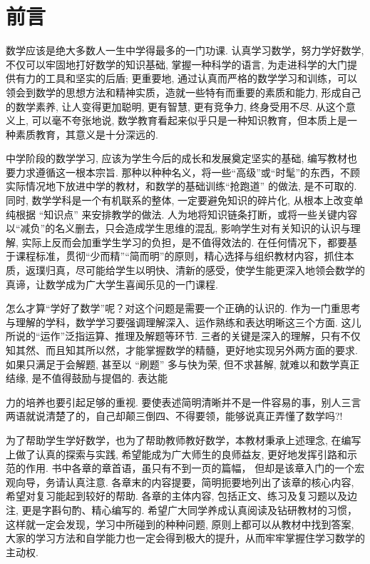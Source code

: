 \documentclass[10pt]{article}
\begin{document}
\section*{前言}

数学应该是绝大多数人一生中学得最多的一门功课. 认真学习数学，努力学好数学, 不仅可以牢固地打好数学的知识基础, 掌握一种科学的语言, 为走进科学的大门提供有力的工具和坚实的后盾; 更重要地, 通过认真而严格的数学学习和训练，可以领会到数学的思想方法和精神实质，造就一些特有而重要的素质和能力, 形成自己的数学素养, 让人变得更加聪明, 更有智慧, 更有竞争力, 终身受用不尽. 从这个意义上, 可以毫不夸张地说, 数学教育看起来似乎只是一种知识教育，但本质上是一种素质教育，其意义是十分深远的.

中学阶段的数学学习, 应该为学生今后的成长和发展奠定坚实的基础, 编写教材也要力求遵循这一根本宗旨. 那种以种种名义，将一些“高级”或“时髦”的东西，不顾实际情况地下放进中学的教材，和数学的基础训练“抢跑道” 的做法, 是不可取的. 同时, 数学学科是一个有机联系的整体, 一定要避免知识的碎片化, 从根本上改变单纯根据 “知识点” 来安排教学的做法. 人为地将知识链条打断，或将一些关键内容以“减负”的名义删去，只会造成学生思维的混乱, 影响学生对有关知识的认识与理解, 实际上反而会加重学生学习的负担，是不值得效法的. 在任何情况下，都要基于课程标准，贯彻“少而精”“简而明”的原则，精心选择与组织教材内容，抓住本质，返璞归真，尽可能给学生以明快、清新的感受，使学生能更深入地领会数学的真谛，让数学成为广大学生喜闻乐见的一门课程.

怎么才算“学好了数学”呢？对这个问题是需要一个正确的认识的. 作为一门重思考与理解的学科，数学学习要强调理解深入、运作熟练和表达明晰这三个方面. 这儿所说的“运作”泛指运算、推理及解题等环节. 三者的关键是深入的理解，只有不仅知其然、而且知其所以然，才能掌握数学的精髓，更好地实现另外两方面的要求. 如果只满足于会解题, 甚至以 “刷题” 多与快为荣, 但不求甚解, 就难以和数学真正结缘, 是不值得鼓励与提倡的. 表达能

力的培养也要引起足够的重视. 要使表述简明清晰并不是一件容易的事，别人三言两语就说清楚了的，自己却颠三倒四、不得要领，能够说真正弄懂了数学吗?!

为了帮助学生学好数学，也为了帮助教师教好数学，本教材秉承上述理念, 在编写上做了认真的探索与实践, 希望能成为广大师生的良师益友, 更好地发挥引路和示范的作用. 书中各章的章首语，虽只有不到一页的篇幅， 但却是该章入门的一个宏观向导，务请认真注意. 各章末的内容提要，简明扼要地列出了该章的核心内容, 希望对复习能起到较好的帮助. 各章的主体内容, 包括正文、练习及复习题以及边注, 更是字斟句酌、精心编写的. 希望广大同学养成认真阅读及钻研教材的习惯，这样就一定会发现，学习中所碰到的种种问题, 原则上都可以从教材中找到答案, 大家的学习方法和自学能力也一定会得到极大的提升，从而牢牢掌握住学习数学的主动权.
\end{document}
